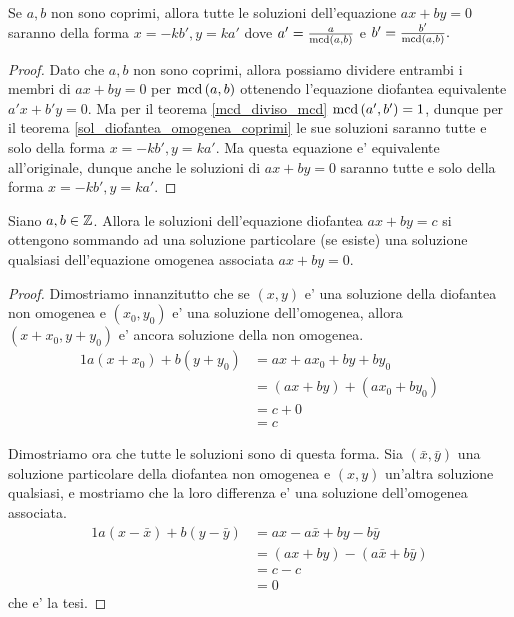 \begin{corollary} \label{sol_diofantea_omogenea}
    Se $a, b$ non sono coprimi, allora tutte le soluzioni dell'equazione $ax + by = 0$ saranno della forma
    $x = -kb', y = ka'$ dove $a' = \frac{a}{\operatorname{mcd}\left(a, b\right)}$ e $b' = \frac{b'}{\operatorname{mcd}\left(a, b\right)}.$
\end{corollary}
\begin{proof}
    Dato che $a, b$ non sono coprimi, allora possiamo dividere entrambi i membri di $ax + by = 0$
    per $\operatorname{mcd}\left(a, b\right)$ ottenendo l'equazione diofantea equivalente $a'x + b'y = 0$. Ma per il teorema
    \ref{mcd_diviso_mcd} $\operatorname{mcd}\left(a', b'\right) = 1$, dunque per il teorema \ref{sol_diofantea_omogenea_coprimi}
    le sue soluzioni saranno tutte e solo della forma $x = -kb', y = ka'$. Ma questa equazione
    e' equivalente all'originale, dunque anche le soluzioni di $ax + by = 0$ saranno tutte e solo
    della forma $x = -kb', y = ka'$.
\end{proof}

\begin{theorem} \label{sol_diofantea_non_omog}
    Siano $a, b \in \mathbb{Z}$. Allora le soluzioni dell'equazione diofantea $ax + by = c$ 
    si ottengono sommando ad una soluzione particolare (se esiste) una soluzione qualsiasi dell'equazione
    omogenea associata $ax + by = 0$.
\end{theorem}
\begin{proof}
    Dimostriamo innanzitutto che se $(x, y)$ e' una soluzione della diofantea non omogenea e $(x_0, y_0)$
    e' una soluzione dell'omogenea, allora $(x+x_0, y+y_0)$ e' ancora soluzione della non omogenea.
    \begin{alignat*}{1}
        a(x + x_0) + b(y + y_0) &= ax + ax_0 + by + by_0 \\
                                &= (ax + by) + (ax_0 + by_0) \\
                                &= c + 0\\
                                &= c
    \end{alignat*}

    Dimostriamo ora che tutte le soluzioni sono di questa forma. Sia $(\bar{x}, \bar{y})$ una
    soluzione particolare della diofantea non omogenea e $(x, y)$ un'altra soluzione qualsiasi,
    e mostriamo che la loro differenza e' una soluzione dell'omogenea associata.
    \begin{alignat*}
        {1}
        a(x - \bar{x}) + b(y - \bar{y}) &= ax - a\bar{x} + by - b\bar{y} \\
                                        &= (ax + by) - (a\bar{x} + b\bar{y}) \\
                                        &= c - c\\
                                        &= 0
    \end{alignat*}
    che e' la tesi.
\end{proof}


